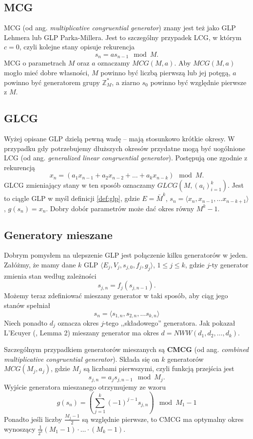 \documentclass[a4paper,11pt,twoside]{book}
\theoremstyle{definition}
\begin{document}
\subsection*{MCG}
MCG (od ang. \textit{multiplicative congruential generator}) znany jest też jako GLP Lehmera lub GLP Parka-Millera. 
Jest to szczególny przypadek LCG, w którym $c = 0$, czyli kolejne stany opisuje rekurencja
\begin{equation}
 \label{eq:mcg}
 s_n = a s_{n-1} \mod M.
\end{equation}
MCG o parametrach $M$ oraz $a$ oznaczamy $MCG(M, a)$. Aby $MCG(M,a)$ mogło mieć dobre własności, $M$ powinno być liczbą pierwszą lub jej potęgą, $a$ powinno być generatorem grupy $\mathbb{Z}_M^*$, a ziarno $s_0$ powinno być względnie pierwsze z $M$. 

\subsection*{GLCG}
Wyżej opisane GLP dzielą pewną wadę -- mają stosunkowo krótkie okresy. W przypadku gdy potrzebujemy dłuższych okresów przydatne mogą być uogólnione LCG (od ang. \textit{generalized linear congruential generator}). Postępują one zgodnie z rekurencją
\begin{equation}
 \label{eq:glcg}
 x_n = (a_1 x_{n-1} + a_2 x_{n-2} + \ldots + a_k x_{n-k}) \mod M.
\end{equation}
GLCG zmieniający stany w ten sposób oznaczamy $GLCG(M, (a_i)_{i=1}^k)$. Jest to ciągle GLP w myśl definicji \ref{def:glp}, gdzie $E = \bar{M}^k$, $s_n = \langle x_n, x_{n-1}, \ldots  x_{n-k+1} \rangle$, $g(s_n) = x_n$. Dobry dobór parametrów może dać okres równy $M^k-1$.

\subsection*{Generatory mieszane}
Dobrym pomysłem na ulepszenie GLP jest połączenie kilku generatorów w jeden. Załóżmy, że mamy dane $k$ GLP $\langle E_j, V_j, s_{j,0}, f_j, g_j \rangle$, $1 \leq j \leq k$, gdzie $j$-ty generator zmienia stan według zależności 
\[ s_{j,n} = f_j(s_{j,n-1}). \]
Możemy teraz zdefiniować mieszany generator w taki sposób, aby ciąg jego stanów spełniał
\[ s_n = \langle s_{1,n}, s_{2,n}, \ldots s_{k,n} \rangle\]
Niech ponadto $d_j$ oznacza okres $j$-tego ,,składowego'' generatora. Jak pokazał L'Ecuyer (\cite{lecuyer}, Lemma 2) mieszany generator ma okres $d = NWW(d_1, d_2,\ldots,d_k)$.

Szczególnym przypadkiem generatorów mieszanych są \textbf{CMCG} (od ang. \textit{combined multiplicative congruential generator}). Składa się on $k$ generatorów $MCG(M_j, a_j)$, gdzie $M_j$ są liczbami pierwszymi, czyli funkcją przejścia jest
\[ s_{j,n} = a_j s_{j,n-1} \mod M_j. \]
Wyjście generatora mieszanego otrzymujemy ze wzoru
\[ g(s_n) = \left( \sum_{j=1}^{k} (-1)^{j-1} s_{j,n} \right) \mod M_1 - 1\]
Ponadto jeśli liczby $\frac{M_j-1}{2}$ są względnie pierwsze, to CMCG ma optymalny okres wynoszący $\frac{1}{2^k}(M_1-1)\cdot \ldots \cdot (M_k-1)$.
\end{document}
